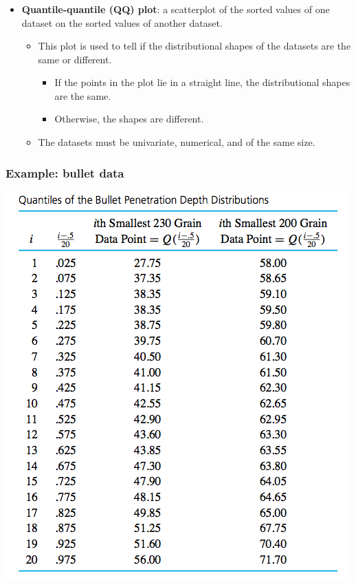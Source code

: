 \documentclass{beamer}
\numberwithin{equation}{section}
\begin{document}
\begin{frame}
\frametitle{}
\begin{itemize}
\item {\bf Quantile-quantile (QQ) plot}: a scatterplot of the sorted values of one dataset on the sorted values of another dataset.
\begin{itemize}
\pause \item This plot is used to tell if the distributional shapes of the datasets are the same or different.
\begin{itemize}
\pause \item  If the points in the plot lie in a straight line, the distributional shapes are the same.
\pause \item Otherwise, the shapes are different.
\end{itemize}
\pause \item The datasets must be univariate, numerical, and of the same size.
\end{itemize}
\end{itemize}
\end{frame}

\begin{frame}
\frametitle{Example: bullet data}
\begin{center}
 \includegraphics{../../fig/bulletquantiles.png}
\end{center}
\end{frame}
\end{document}
